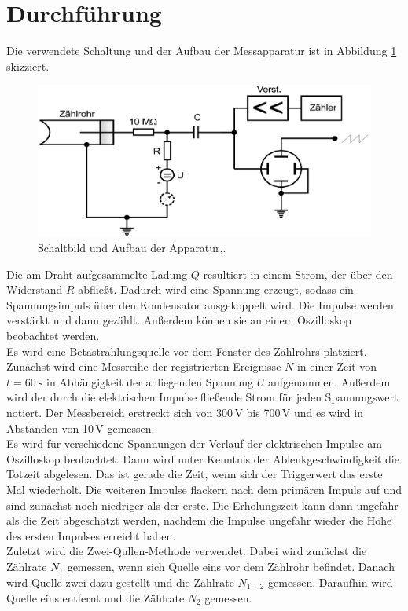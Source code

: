 \section{Durchführung}
\label{sec:Durchführung}
Die verwendete Schaltung und der Aufbau der Messapparatur ist in Abbildung \ref{fig:schaltung} skizziert.

\begin{figure}
  \centering
  \includegraphics[width=\textwidth]{data/schaltung.png}
  \caption{Schaltbild und Aufbau der Apparatur,\cite{Versuchsanleitung}.}
  \label{fig:schaltung}
\end{figure}

Die am Draht aufgesammelte Ladung $Q$ resultiert in einem Strom, der über den Widerstand $R$
abfließt. Dadurch wird eine Spannung erzeugt, sodass ein Spannungsimpuls über den Kondensator
ausgekoppelt wird. Die Impulse werden verstärkt und dann gezählt. Außerdem können sie an einem Oszilloskop
beobachtet werden.\\
Es wird eine Betastrahlungsquelle vor dem Fenster des Zählrohrs platziert.
Zunächst wird eine Messreihe der registrierten Ereignisse $N$ in einer Zeit von $t=\SI{60}{\second}$
in Abhängigkeit der anliegenden Spannung $U$ aufgenommen. Außerdem wird der durch die elektrischen
Impulse fließende Strom für jeden Spannungswert notiert. Der Messbereich erstreckt sich
von 300\,V bis 700\,V und es wird in Abständen von 10\,V gemessen.\\
Es wird für verschiedene Spannungen der Verlauf der elektrischen Impulse
am Oszilloskop beobachtet. Dann wird unter Kenntnis der Ablenkgeschwindigkeit die Totzeit
abgelesen. Das ist gerade die Zeit, wenn sich der Triggerwert das erste Mal wiederholt.
Die weiteren Impulse flackern nach dem primären Impuls auf und sind zunächst noch niedriger
als der erste. Die Erholungszeit kann dann ungefähr als die Zeit abgeschätzt werden,
nachdem die Impulse ungefähr wieder die Höhe des ersten Impulses erreicht haben.\\
Zuletzt wird die Zwei-Qullen-Methode verwendet. Dabei wird zunächst die Zählrate $N_1$ gemessen,
wenn sich Quelle eins vor dem Zählrohr befindet. Danach wird Quelle zwei dazu gestellt und
die Zählrate $N_{1+2}$ gemessen. Daraufhin wird Quelle eins entfernt und die Zählrate $N_2$ gemessen.
